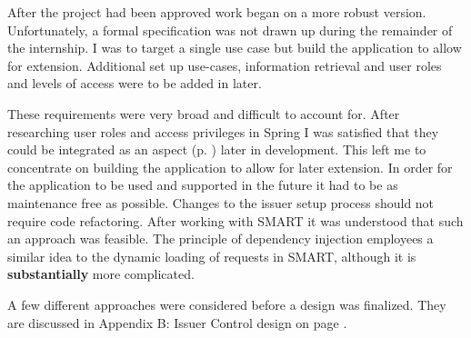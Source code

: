 \documentclass[a4paper, 11pt, titlepage]{article}
\begin{document}
After the project had been approved work began on a more robust version. Unfortunately, a formal specification was not drawn up during the remainder of the internship. I was to target a single use case but build the application to allow for extension. Additional set up use-cases, information retrieval and user roles and levels of access were to be added in later. 
 
These requirements were very broad and difficult to account for. After researching user roles and access privileges in Spring I was satisfied that they could be integrated as an aspect (p. \pageref{aspects}) later in development. This left me to concentrate on building the application to allow for later extension. In order for the application to be used and supported in the future it had to be as maintenance free as possible. Changes to the issuer setup process should not require code refactoring. After working with SMART it was understood that such an approach was feasible. The principle of dependency injection employees a similar idea to the dynamic loading of requests in SMART, although it is \textbf{substantially} more complicated. 

A few different approaches were considered before a design was finalized. They are discussed in Appendix B: Issuer Control design on page \pageref{issuer_control}.
 
\end{document}
